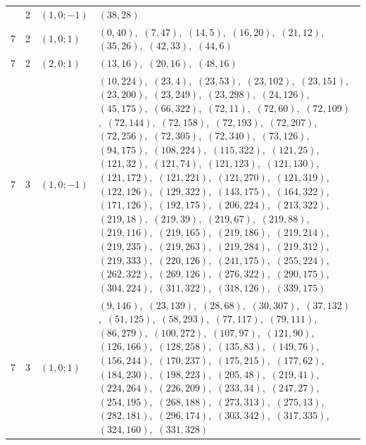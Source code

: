 \documentclass[11pt]{article}
\begin{document}
\begin{longtable}{@{}rrl>{\raggedright\arraybackslash}p{}@{}}
\addlinespace[3pt]
7 & 2 & $(1,0;-1)$ & $(38,28)$\\
7 & 2 & $(1,0;1)$ & $(0,40)$,\allowbreak\ $(7,47)$,\allowbreak\ $(14,5)$,\allowbreak\ $(16,20)$,\allowbreak\ $(21,12)$,\allowbreak\ $(35,26)$,\allowbreak\ $(42,33)$,\allowbreak\ $(44,6)$\\
7 & 2 & $(2,0;1)$ & $(13,16)$,\allowbreak\ $(20,16)$,\allowbreak\ $(48,16)$\\
7 & 3 & $(1,0;-1)$ & $(10,224)$,\allowbreak\ $(23,4)$,\allowbreak\ $(23,53)$,\allowbreak\ $(23,102)$,\allowbreak\ $(23,151)$,\allowbreak\ $(23,200)$,\allowbreak\ $(23,249)$,\allowbreak\ $(23,298)$,\allowbreak\ $(24,126)$,\allowbreak\ $(45,175)$,\allowbreak\ $(66,322)$,\allowbreak\ $(72,11)$,\allowbreak\ $(72,60)$,\allowbreak\ $(72,109)$,\allowbreak\ $(72,144)$,\allowbreak\ $(72,158)$,\allowbreak\ $(72,193)$,\allowbreak\ $(72,207)$,\allowbreak\ $(72,256)$,\allowbreak\ $(72,305)$,\allowbreak\ $(72,340)$,\allowbreak\ $(73,126)$,\allowbreak\ $(94,175)$,\allowbreak\ $(108,224)$,\allowbreak\ $(115,322)$,\allowbreak\ $(121,25)$,\allowbreak\ $(121,32)$,\allowbreak\ $(121,74)$,\allowbreak\ $(121,123)$,\allowbreak\ $(121,130)$,\allowbreak\ $(121,172)$,\allowbreak\ $(121,221)$,\allowbreak\ $(121,270)$,\allowbreak\ $(121,319)$,\allowbreak\ $(122,126)$,\allowbreak\ $(129,322)$,\allowbreak\ $(143,175)$,\allowbreak\ $(164,322)$,\allowbreak\ $(171,126)$,\allowbreak\ $(192,175)$,\allowbreak\ $(206,224)$,\allowbreak\ $(213,322)$,\allowbreak\ $(219,18)$,\allowbreak\ $(219,39)$,\allowbreak\ $(219,67)$,\allowbreak\ $(219,88)$,\allowbreak\ $(219,116)$,\allowbreak\ $(219,165)$,\allowbreak\ $(219,186)$,\allowbreak\ $(219,214)$,\allowbreak\ $(219,235)$,\allowbreak\ $(219,263)$,\allowbreak\ $(219,284)$,\allowbreak\ $(219,312)$,\allowbreak\ $(219,333)$,\allowbreak\ $(220,126)$,\allowbreak\ $(241,175)$,\allowbreak\ $(255,224)$,\allowbreak\ $(262,322)$,\allowbreak\ $(269,126)$,\allowbreak\ $(276,322)$,\allowbreak\ $(290,175)$,\allowbreak\ $(304,224)$,\allowbreak\ $(311,322)$,\allowbreak\ $(318,126)$,\allowbreak\ $(339,175)$\\
7 & 3 & $(1,0;1)$ & $(9,146)$,\allowbreak\ $(23,139)$,\allowbreak\ $(28,68)$,\allowbreak\ $(30,307)$,\allowbreak\ $(37,132)$,\allowbreak\ $(51,125)$,\allowbreak\ $(58,293)$,\allowbreak\ $(77,117)$,\allowbreak\ $(79,111)$,\allowbreak\ $(86,279)$,\allowbreak\ $(100,272)$,\allowbreak\ $(107,97)$,\allowbreak\ $(121,90)$,\allowbreak\ $(126,166)$,\allowbreak\ $(128,258)$,\allowbreak\ $(135,83)$,\allowbreak\ $(149,76)$,\allowbreak\ $(156,244)$,\allowbreak\ $(170,237)$,\allowbreak\ $(175,215)$,\allowbreak\ $(177,62)$,\allowbreak\ $(184,230)$,\allowbreak\ $(198,223)$,\allowbreak\ $(205,48)$,\allowbreak\ $(219,41)$,\allowbreak\ $(224,264)$,\allowbreak\ $(226,209)$,\allowbreak\ $(233,34)$,\allowbreak\ $(247,27)$,\allowbreak\ $(254,195)$,\allowbreak\ $(268,188)$,\allowbreak\ $(273,313)$,\allowbreak\ $(275,13)$,\allowbreak\ $(282,181)$,\allowbreak\ $(296,174)$,\allowbreak\ $(303,342)$,\allowbreak\ $(317,335)$,\allowbreak\ $(324,160)$,\allowbreak\ $(331,328)$\\

\end{longtable}
\end{document}
